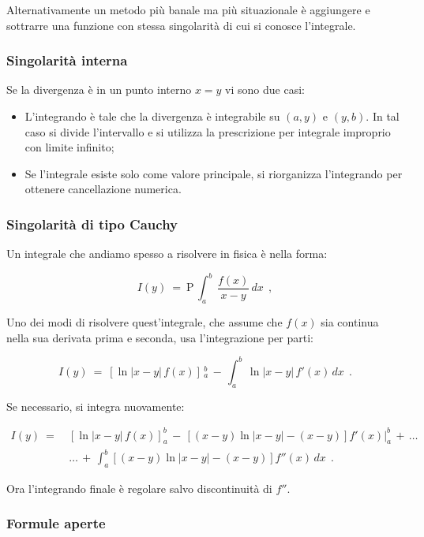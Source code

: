 Alternativamente un metodo più banale ma più situazionale è aggiungere e sottrarre una funzione con stessa singolarità di cui si conosce l'integrale.

\subsubsection{Singolarità interna}

Se la divergenza è in un punto interno $x=y$ vi sono due casi:

\begin{itemize}
	\item L'integrando è tale che la divergenza è integrabile su $(a,y)$ e $(y,b)$. In tal caso si divide l’intervallo e si utilizza la prescrizione per integrale improprio con limite infinito;
	\item Se l’integrale esiste solo come valore principale, si riorganizza l’integrando per ottenere cancellazione numerica.
\end{itemize}

\subsubsection{Singolarità di tipo Cauchy}

Un integrale che andiamo spesso a risolvere in fisica è nella forma:

\[ I(y)\ =\ \mathrm{P}\,\int_a^b\, \frac{f(x)}{x-y}\, dx\ \ ,\]

Uno dei modi di risolvere quest'integrale, che assume che $f(x)$ sia continua nella sua derivata prima e seconda, usa l'integrazione per parti:

\[ I(y)\ =\
\left[\ln|x-y|\,f(x)\right]\,_a^b\,
-\,
\int_a^b\, \ln|x-y|\,f'(x)\,dx\ \ .
\]

Se necessario, si integra nuovamente:

\[\begin{aligned}
	I(y)\ =\
	&\left[\ln|x-y|\,f(x)\right]_a^b
	\, -\,
	\left[(x-y)\ln|x-y|-(x-y)\right]f'(x)\Big|_a^b
	\, +\, \dots\\
	&\dots \, +\, \int_a^b [(x-y)\ln|x-y|-(x-y)] f''(x)\,dx\ \ .
\end{aligned}\]

Ora l'integrando finale è regolare salvo discontinuità di $f''$.

\subsubsection{Formule aperte}

